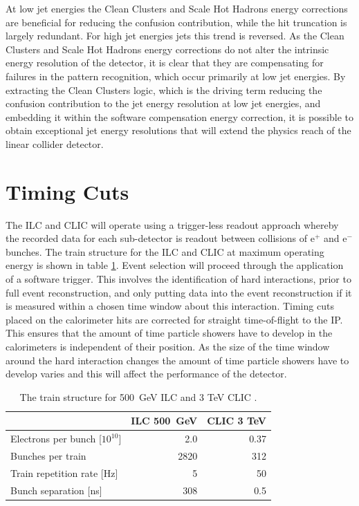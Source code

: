 At low jet energies the Clean Clusters and Scale Hot Hadrons energy corrections are beneficial for reducing the confusion contribution, while the hit truncation is largely redundant.  For high jet energies jets this trend is reversed.  As the Clean Clusters and Scale Hot Hadrons energy corrections do not alter the intrinsic energy resolution of the detector, it is clear that they are compensating for failures in the pattern recognition, which occur primarily at low jet energies.  By extracting the Clean Clusters logic, which is the driving term reducing the confusion contribution to the jet energy resolution at low jet energies, and embedding it within the software compensation energy correction, it is possible to obtain exceptional jet energy resolutions that will extend the physics reach of the linear collider detector.  



\section{Timing Cuts}
The ILC and CLIC will operate using a trigger-less readout approach whereby the recorded data for each sub-detector is readout between collisions of $\text{e}^{+}$ and $\text{e}^{-}$ bunches.  The train structure for the ILC and CLIC at maximum operating energy is shown in table \ref{table:trainstructure}.  Event selection will proceed through the application of a software trigger.  This involves the identification of hard interactions, prior to full event reconstruction, and only putting data into the event reconstruction if it is measured within a chosen time window about this interaction.  Timing cuts placed on the calorimeter hits are corrected for straight time-of-flight to the IP.  This ensures that the amount of time particle showers have to develop in the calorimeters is independent of their position.  As the size of the time window around the hard interaction changes the amount of time particle showers have to develop varies and this will affect the performance of the detector.  

\begin{table}[h!]
\centering
\begin{tabular}{l r r}
\hline
& ILC 500~GeV & CLIC 3 TeV \\
\hline
Electrons per bunch [$10^{10}$] & 2.0 & 0.37 \\
Bunches per train & 2820 & 312 \\
Train repetition rate [Hz] & 5 & 50 \\
Bunch separation [ns] & 308 & 0.5 \\
\end{tabular}
\caption[The train structure for 500~GeV ILC and 3 TeV CLIC \cite{Behnke:2013lya,Linssen:2012hp}.]{The train structure for 500~GeV ILC and 3 TeV CLIC \cite{Behnke:2013lya,Linssen:2012hp}.}
\label{table:trainstructure}
\end{table}

